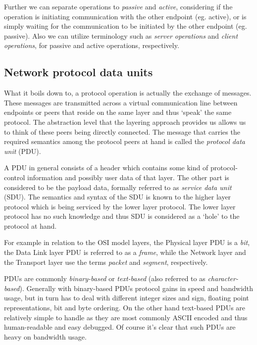 \documentclass[times, utf8, diplomski]{fer}
\begin{document}
Further we can separate operations to \emph{passive} and \emph{active}, considering 
if the operation is initiating communication with the other endpoint (eg. active),
or is simply waiting for the communication to be initiated by the other endpoint 
(eg. passive). Also we can utilize terminology such as \emph{server operations} 
and \emph{client operations}, for passive and active operations, respectively.

\subsection{Network protocol data units}
What it boils down to, a protocol operation is actually the exchange of messages.
These messages are transmitted across a virtual communication line between endpoints
or peers that reside on the same layer and thus `speak' the same protocol. 
The abstraction level that the layering approach provides us allows us to think 
of these peers being directly connected. The message that carries the required 
semantics among the protocol peers at hand is called the \emph{protocol data unit}
(PDU).

A PDU in general consists of a header which contains some kind of protocol-control 
information and possibly user data of that layer. The other part is considered 
to be the payload data, formally referred to as \emph{service data unit} (SDU). 
The semantics and syntax of the SDU is known to the higher layer protocol which 
is being serviced by the lower layer protocol. The lower layer protocol has no 
such knowledge and thus SDU is considered as a `hole' to the protocol at hand.

For example in relation to the OSI model layers, the Physical layer PDU is a 
\emph{bit}, the Data Link layer PDU is referred to as a \emph{frame}, while the 
Network layer and the Transport layer use the terms \emph{packet} and 
\emph{segment}, respectively.

PDUs are commonly \emph{binary-based} or \emph{text-based} (also referred to as 
\emph{character-based}). Generally with binary-based PDUs 
protocol gains in speed and bandwidth usage, but in turn has to deal with 
different integer sizes and sign, floating point representations, bit and byte 
ordering. On the other hand text-based PDUs are relatively simple to handle as 
they are most commonly ASCII encoded and thus human-readable and easy debugged.
Of course it's clear that such PDUs are heavy on bandwidth usage. 
\end{document}
